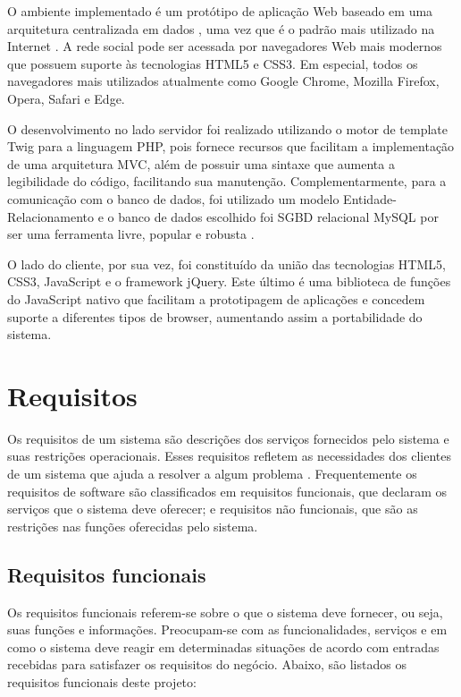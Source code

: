 \documentclass[cic,tc]{iiufrgs}
\begin{document}
O ambiente implementado é um protótipo de aplicação Web baseado em uma arquitetura centralizada em dados \cite{pressman}, uma vez que é o padrão mais utilizado na Internet \cite{kurose}. A rede social pode ser acessada por navegadores Web mais modernos que possuem suporte às tecnologias HTML5 e CSS3. Em especial, todos os navegadores mais utilizados atualmente como Google Chrome, Mozilla Firefox, Opera, Safari e Edge.

O desenvolvimento no lado servidor foi realizado utilizando o motor de template Twig para a linguagem PHP, pois fornece recursos que facilitam a implementação de uma arquitetura MVC, além de possuir uma sintaxe que aumenta a legibilidade do código, facilitando sua manutenção. Complementarmente, para a comunicação com o banco de dados, foi utilizado um modelo Entidade-Relacionamento e o banco de dados escolhido foi SGBD relacional MySQL por ser uma ferramenta livre, popular e robusta \cite{mysql}.

O lado do cliente, por sua vez, foi constituído da união das tecnologias HTML5, CSS3, JavaScript e o framework jQuery. Este último é uma biblioteca de funções do JavaScript nativo que facilitam a prototipagem de aplicações e concedem suporte a diferentes tipos de browser, aumentando assim a portabilidade do sistema.


\section{Requisitos}
\label{metodologiaRequisitos}
Os requisitos de um sistema são descrições dos serviços fornecidos pelo sistema e suas restrições operacionais. Esses requisitos refletem as necessidades dos clientes de um sistema que ajuda a resolver a algum problema \cite{sommerville}. Frequentemente os requisitos de software são classificados em requisitos funcionais, que declaram os serviços que o sistema deve oferecer; e requisitos não funcionais, que são as restrições nas funções oferecidas pelo sistema. 

\subsection{Requisitos funcionais}
\label{requisitosRF}
Os requisitos funcionais referem-se sobre o que o sistema deve fornecer, ou seja, suas funções e informações. Preocupam-se com as funcionalidades, serviços e em como o sistema deve reagir em determinadas situações de acordo com entradas recebidas para satisfazer os requisitos do negócio. Abaixo, são listados os requisitos funcionais deste projeto:  
\end{document}
